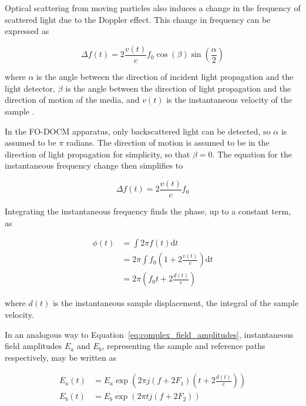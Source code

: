 
Optical scattering from moving particles also induces a change in the frequency of scattered light due to the Doppler effect. This change in frequency can be expressed as


\begin{equation} \Delta f(t) = 2 \frac{v(t)}{c} f_0 \cos{(\beta)} \sin{(\frac{\alpha}{2})} \end{equation}

\noindent where $\alpha$ is the angle between the direction of incident light propagation and the  light detector, $\beta$ is the angle between the direction of light propagation and the direction of motion of the media, and $v(t)$ is the instantaneous velocity of the sample \cite{hurst}.

In the FO-DOCM apparatus, only backscattered light can be detected, so $\alpha$ is assumed to be $\pi$ radians. The direction of motion is assumed to be in the direction of light propagation for simplicity, so that $\beta = 0$. The equation for the instantaneous frequency change then simplifies to

\begin{equation} \Delta f(t) = 2 \frac{v(t)}{c} f_0 \end{equation}

Integrating the instantaneous frequency finds the phase, up to a constant term, as

\begin{equation}
\begin{aligned}
\phi(t) & = \int 2 \pi f(t) \mathrm{d}t \\
& = 2 \pi \int f_0 (1 + 2 \frac{v(t)}{c}) \mathrm{d}t \\
& = 2 \pi \left( f_0 t + 2 \frac{d(t)}{c} \right)
\end{aligned}
\end{equation}

\noindent where $d(t)$ is the instantaneous sample displacement, the integral of the sample velocity.

In an analogous way to Equation~\ref{eq:complex_field_amplitudes}, instantaneous field amplitudes $E_a$ and $E_b$, representing the sample and reference paths respectively, may be written as

\begin{equation}
\begin{aligned}
E_a(t) & = E_a \exp{\left(2 \pi j (f + 2 F_1) \left( t + 2 \frac{d(t)}{c}\right) \right)}  \\
E_b(t) & = E_b \exp{(2 \pi t j (f + 2 F_2))}
\end{aligned}
\end{equation}

